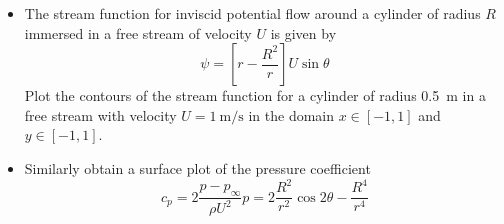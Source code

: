 \begin{frame}
    \begin{exercise}
        \begin{itemize}
            \setitemsep{1em}
            \item The stream function for inviscid potential flow around a cylinder of radius $R$ immersed in a free stream of velocity $U$ is given by
            \begin{equation*}
                \psi = \left[ r - \frac{R^2}{r} \right] U \sin \theta
            \end{equation*}
            Plot the contours of the stream function for a cylinder of radius \SI{0.5}{\meter} in a free stream with velocity $U=\SI{1}{\meter\per\second}$ in the domain $x \in [-1,1]$ and $y \in [-1,1]$.\\
            \item<2-> Similarly obtain a surface plot of the pressure coefficient
            \begin{equation*}
                c_p = 2\frac{p-p_\infty}{\rho U^2}p = 2\frac{R^2}{r^2} \cos 2\theta - \frac{R^4}{r^4}
            \end{equation*}
        \end{itemize}
    \end{exercise}
\end{frame}

